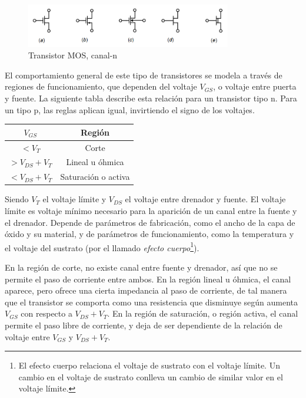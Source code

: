 \documentclass[12pt]{report} %
\begin{document}
	
	\begin{figure}[H]
		\includegraphics[width=0.8\textwidth]{n-mos-symbol.png}
		\caption[Transistor MOS, canal-n]{Transistor MOS, canal-n\protect\footnotemark}
		\label{fig:n-mos-symbol.png}
	\end{figure}


	El comportamiento general de este tipo de transistores se modela a través de regiones de funcionamiento, que dependen del voltaje $V_{GS}$, o voltaje entre puerta y fuente.
	La siguiente tabla describe esta relación para un transistor tipo n. Para un tipo p, las reglas aplican igual, invirtiendo el signo de los voltajes.
	
	\begin{table}[H]
		\begin{tabular}{|c|c|}
			\hline
			$V_{GS}$ & Región \\
			\hline
			$< V_{T}$ & Corte \\
			\hline
			$> V_{DS} + V_{T}$ & Lineal u óhmica \\
			\hline
			$< V_{DS} + V_{T}$ & Saturación o activa \\
			\hline
		\end{tabular}
	\end{table}

	Siendo $V_{T}$ el voltaje límite y $V_{DS}$ el voltaje entre drenador y fuente. El voltaje límite es voltaje mínimo necesario para la aparición de un canal entre la fuente y el drenador. Depende de parámetros de fabricación, como el ancho de la capa de óxido y su material, y de parámetros de funcionamiento, como la temperatura y el voltaje del sustrato (por el llamado \textit{efecto cuerpo}\footnote{El efecto cuerpo relaciona el voltaje de sustrato con el voltaje límite. Un cambio en el voltaje de sustrato conlleva un cambio de similar valor en el voltaje límite.}). %
	
	En la región de corte, no existe canal entre fuente y drenador, así que no se permite el paso de corriente entre ambos. En la región lineal u óhmica, el canal aparece, pero ofrece una cierta impedancia al paso de corriente, de tal manera que el transistor se comporta como una resistencia que disminuye según aumenta $V_{GS}$ con respecto a $V_{DS} + V_{T}$. En la región de saturación, o región activa, el canal permite el paso libre de corriente, y deja de ser dependiente de la relación de voltaje entre $V_{GS}$ y $V_{DS} + V_{T}$.
	
\end{document}
